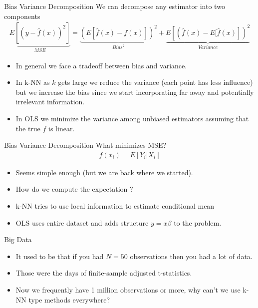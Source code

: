 \documentclass[11pt,handout,xcolor=pdftex,dvipsnames,table,mathserif]{beamer}
\begin{document}
\begin{frame}{Bias Variance Decomposition}
We can decompose any estimator into two components
\begin{eqnarray*}
\underbrace{E[(y- \hat{f}(x))^2]}_{MSE} =\underbrace{\left( E[\hat{f}(x) - f(x)] \right)^2}_{Bias^2}  +  \underbrace{E \left[ \left(\hat{f}(x) - E[\hat{f}(x) \right] \right)^2}_{Variance} 
\end{eqnarray*}
\begin{itemize}
\item In general we face a tradeoff between bias and variance.
\item In k-NN as $k$ gets large we reduce the variance (each point has less influence) but we increase the bias since we start incorporating far away and potentially irrelevant information.
\item In OLS we minimize the variance among unbiased estimators assuming that the true $f$ is linear.
\end{itemize}
\end{frame}

\begin{frame}{Bias Variance Decomposition}
What minimizes MSE?
\begin{eqnarray*}
f(x_i) = E[Y_i | X_i] 
\end{eqnarray*}
\begin{itemize}
\item Seems simple enough (but we are back where we started).
\item How do we compute the expectation ?
\item k-NN tries to use local information to estimate conditional mean
\item OLS uses entire dataset and adds structure $ y = x \beta$ to the problem.
\end{itemize}
\end{frame}


\begin{frame}{Big Data}
\begin{itemize}
\item It used to be that if you had $N=50$ observations then you had a lot of data.
\item Those were the days of finite-sample adjusted t-statistics.
\item Now we frequently have 1 million observations or more, why can't we use k-NN type methods everywhere?
\end{itemize}
\end{frame}
\end{document}
